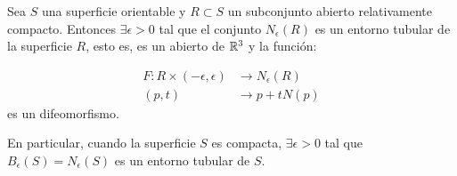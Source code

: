 \begin{theorem}
Sea $S$ una superficie orientable y $R \subset S$ un subconjunto abierto relativamente compacto. Entonces $\exists \epsilon > 0$ tal que el conjunto $N_\epsilon(R)$ es un entorno tubular de la superficie $R$, esto es, es un abierto de $\mathbb{R}^3$ y la función:

\begin{align*}
    F: R \times (-\epsilon, \epsilon) &\longrightarrow N_\epsilon(R) \\
    (p,t) &\longrightarrow p + tN(p)
\end{align*}
%
es un difeomorfismo.

En particular, cuando la superficie $S$ es compacta, $\exists \epsilon > 0$ tal que
$B_\epsilon(S)=N_\epsilon(S)$ es un entorno tubular de $S$.
\end{theorem}
